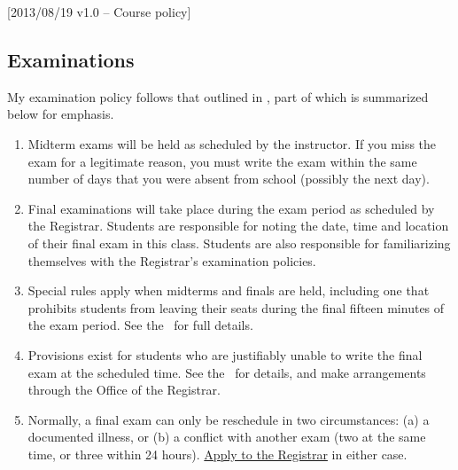 [2013/08/19 v1.0 -- Course policy]

\subsection{Examinations}
\label{exams}

My examination policy follows that outlined in \SecAC, part of which is
summarized below for emphasis.

\begin{enumerate}
  \item
    Midterm exams will be held as scheduled by the instructor. If you miss
    the exam for a legitimate reason, you must write the exam within the same
    number of days that you were absent from school (possibly the next day).
  \item
    Final examinations will take place during the exam period as scheduled
    by the Registrar. Students are responsible for noting the date, time and
    location of their final exam in this class. Students are also responsible
    for familiarizing themselves with the Registrar's examination policies.
  \item
    Special rules apply when midterms and finals are held, including one that
    prohibits students from leaving their seats during the final fifteen minutes
    of the exam period. See the \AC\ for full details.
  \item
    Provisions exist for students who are justifiably unable to write the final
    exam at the scheduled time. See the \AC\ for details, and make arrangements
    through the Office of the Registrar.
  \item
    Normally, a final exam can only be reschedule in two circumstances:
    (a) a documented illness, or (b) a conflict with another
    exam (two at the same time, or three within 24 hours).
    \href{http://www.tyndale.ca/registrar/final-exam-schedule-and-policies}
    {Apply to the Registrar} in either case.
\end{enumerate}
